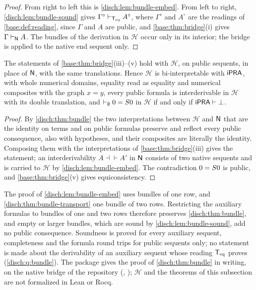 \begin{proof}
From right to left this is \cref{disch:lem:bundle-embed}. From left to
right, \cref{disch:lem:bundle-sound} gives
$\Gamma^\circ\vdash_{\mathsf{T}_{\mathrm{eq}}}A^\circ$, where $\Gamma^\circ$ and $A^\circ$ are
the readings of \cref{base:def:reading}, since $\Gamma$ and $A$ are public,
and \cref{base:thm:bridge}(i) gives $\Gamma\vdash_{\mathsf{N}}A$. The bundles of
the derivation in $\mathcal H$ occur only in its interior; the bridge is
applied to the native end sequent only.
\end{proof}

\begin{corollary}
\label{disch:cor:bundle-ipra}
The statements of \cref{base:thm:bridge}(iii)--(v) hold with $\mathcal H$,
on public sequents, in place of $\mathsf{N}$, with the same translations. Hence
$\mathcal H$ is bi-interpretable with $\mathsf{iPRA}$, with whole numerical
domains, equality read as equality and numerical composites with the graph
$x=y$, every public formula is interderivable in $\mathcal H$ with its
double translation, and $\vdash_{\emptyset}0=S 0$ in $\mathcal H$ if
and only if $\mathsf{iPRA}\vdash\bot$.
\end{corollary}

\begin{proof}
By \cref{disch:thm:bundle} the two interpretations between $\mathcal H$
and $\mathsf{N}$ that are the identity on terms and on public formulas preserve
and reflect every public consequence, also with hypotheses, and their
composites are literally the identity. Composing them with the
interpretations of \cref{base:thm:bridge}(iii) gives the statement; an
interderivability $A\dashv\vdash A'$ in $\mathsf{N}$ consists of two native
sequents and is carried to $\mathcal H$ by \cref{disch:lem:bundle-embed}.
The contradiction $0=S 0$ is public, and \cref{base:thm:bridge}(v)
gives equiconsistency.
\end{proof}

\begin{remark}
\label{disch:rem:bundle}
The proof of \cref{disch:lem:bundle-embed} uses bundles of one row, and
\cref{disch:thm:bundle-transport} one bundle of two rows. Restricting the
auxiliary formulas to bundles of one and two rows therefore preserves
\cref{disch:thm:bundle}, and empty or larger bundles, which are sound by
\cref{disch:lem:bundle-sound}, add no public consequence. Soundness is
proved for every auxiliary sequent, completeness and the formula round trips
for public sequents only; no statement is made about the derivability of an
auxiliary sequent whose reading $\mathsf{T}_{\mathrm{eq}}$ proves
(\cref{disch:q:bundle}). The package gives the proof of
\cref{disch:thm:bundle} in writing, on the native bridge of the repository
(, ); $\mathcal H$ and the
theorems of this subsection are not formalized in Lean or Rocq.
\end{remark}

